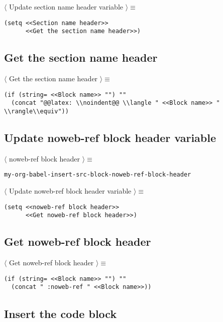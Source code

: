 \documentclass[11pt]{article}
\begin{document}
 \noindent \(\langle\) Update section name header variable \(\rangle \equiv\)
\begin{verbatim}
(setq <<Section name header>>
      <<Get the section name header>>)
\end{verbatim}

\subsection{Get the section name header}
\label{sec:orgf2e3702}

 \noindent \(\langle\) Get the section name header \(\rangle \equiv\)
\begin{verbatim}
(if (string= <<Block name>> "") ""
  (concat "@@latex: \\noindent@@ \\langle " <<Block name>> " \\rangle\\equiv"))
\end{verbatim}

\subsection{Update noweb-ref block header variable}
\label{sec:orgaf82aea}

 \noindent \(\langle\) noweb-ref block header \(\rangle \equiv\)
\begin{verbatim}
my-org-babel-insert-src-block-noweb-ref-block-header
\end{verbatim}

 \noindent \(\langle\) Update noweb-ref block header variable \(\rangle \equiv\)
\begin{verbatim}
(setq <<noweb-ref block header>>
      <<Get noweb-ref block header>>)
\end{verbatim}

\subsection{Get noweb-ref block header}
\label{sec:org268726a}

 \noindent \(\langle\) Get noweb-ref block header \(\rangle \equiv\)
\begin{verbatim}
(if (string= <<Block name>> "") ""
  (concat " :noweb-ref " <<Block name>>))
\end{verbatim}

\subsection{Insert the code block}
\label{sec:org198c187}
\end{document}
